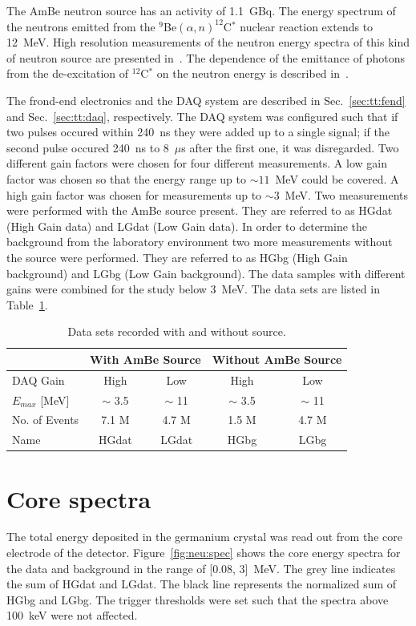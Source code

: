 The AmBe neutron source has an activity of 1.1~GBq. The energy spectrum of the neutrons emitted from the $^{9}$Be$(\alpha,n)^{12}$C$^{*}$ nuclear reaction extends to 12~MeV. High resolution measurements of the neutron energy spectra of this kind of neutron source are presented in~\cite{Mar95,Gei75}. The dependence of the emittance of photons from the de-excitation of $^{12}$C$^{*}$ on the neutron energy is described in~\cite{Gei75}.

The frond-end electronics and the DAQ system are described in Sec.~\ref{sec:tt:fend} and Sec.~\ref{sec:tt:daq}, respectively. The DAQ system was configured such that if two pulses occured within 240~ns they were added up to a single signal; if the second pulse occured 240~ns to 8~$\mu$s after the first one, it was disregarded. Two different gain factors were chosen for four different measurements. A low gain factor was chosen so that the energy range up to $\sim 11$~MeV could be covered. A high gain factor was chosen for measurements up to $\sim 3$~MeV. Two measurements were performed with the AmBe source present. They are referred to as HGdat (High Gain data) and LGdat (Low Gain data). In order to determine the background from the laboratory environment two more measurements without the source were performed. They are referred to as HGbg (High Gain background) and LGbg (Low Gain background). The data samples with different gains were combined for the study below 3~MeV. The data sets are listed in Table~\ref{tab:neu:datset}.

\begin{table}[tbhp]
  \caption{Data sets recorded with and without source.} 
  \label{tab:neu:datset}\centering
  \begin{tabular}{lcccc}\hline
    & \multicolumn{2}{c}{With AmBe Source} &
\multicolumn{2}{c}{Without AmBe Source} \\
    \hline
    DAQ Gain & High  & Low   & High  & Low  \\
    $E_{max}$ [MeV] & $\sim$ 3.5  & $\sim$ 11 & $\sim$ 3.5 & $\sim$ 11
\\
    No. of Events & 7.1 M & 4.7 M & 1.5 M & 4.7 M \\
    Name & HGdat & LGdat & HGbg & LGbg \\\hline
  \end{tabular}
\end{table}

\section{Core spectra}
\label{sec:neu:spec}
The total energy deposited in the germanium crystal was read out from the core electrode of the detector. Figure~\ref{fig:neu:spec} shows the core energy spectra for the data and background in the range of [0.08, 3]~MeV. The grey line indicates the sum of HGdat and LGdat. The black line represents the normalized sum of HGbg and LGbg. The trigger thresholds were set such that the spectra above 100~keV were not affected.

